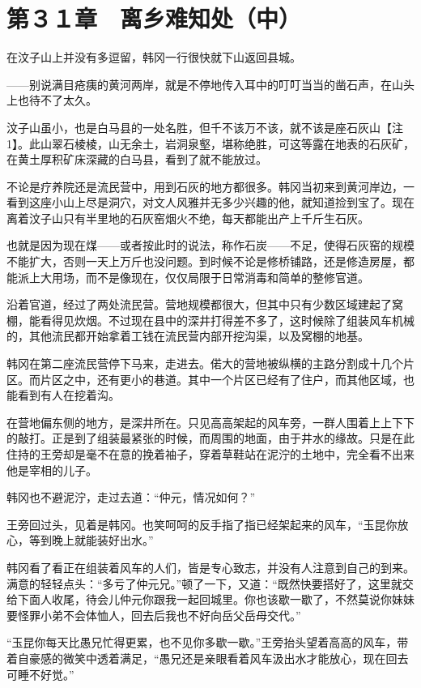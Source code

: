 \section{第３１章　离乡难知处（中）}

在汶子山上并没有多逗留，韩冈一行很快就下山返回县城。

——别说满目疮痍的黄河两岸，就是不停地传入耳中的叮叮当当的凿石声，在山头上也待不了太久。

汶子山虽小，也是白马县的一处名胜，但千不该万不该，就不该是座石灰山【注1】。此山翠石棱棱，山无余土，岩洞泉壑，堪称绝胜，可这等露在地表的石灰矿，在黄土厚积矿床深藏的白马县，看到了就不能放过。

不论是疗养院还是流民营中，用到石灰的地方都很多。韩冈当初来到黄河岸边，一看到这座小山上尽是洞穴，对文人风雅并无多少兴趣的他，就知道捡到宝了。现在离着汶子山只有半里地的石灰窑烟火不绝，每天都能出产上千斤生石灰。

也就是因为现在煤——或者按此时的说法，称作石炭——不足，使得石灰窑的规模不能扩大，否则一天上万斤也没问题。到时候不论是修桥铺路，还是修造房屋，都能派上大用场，而不是像现在，仅仅局限于日常消毒和简单的整修官道。

沿着官道，经过了两处流民营。营地规模都很大，但其中只有少数区域建起了窝棚，能看得见炊烟。不过现在县中的深井打得差不多了，这时候除了组装风车机械的，其他流民都开始拿着工钱在流民营内部开挖沟渠，以及窝棚的地基。

韩冈在第二座流民营停下马来，走进去。偌大的营地被纵横的主路分割成十几个片区。而片区之中，还有更小的巷道。其中一个片区已经有了住户，而其他区域，也能看到有人在挖着沟。

在营地偏东侧的地方，是深井所在。只见高高架起的风车旁，一群人围着上上下下的敲打。正是到了组装最紧张的时候，而周围的地面，由于井水的缘故。只是在此住持的王旁却是毫不在意的挽着袖子，穿着草鞋站在泥泞的土地中，完全看不出来他是宰相的儿子。

韩冈也不避泥泞，走过去道：“仲元，情况如何？”

王旁回过头，见着是韩冈。也笑呵呵的反手指了指已经架起来的风车，“玉昆你放心，等到晚上就能装好出水。”

韩冈看了看正在组装着风车的人们，皆是专心致志，并没有人注意到自己的到来。满意的轻轻点头：“多亏了仲元兄。”顿了一下，又道：“既然快要搭好了，这里就交给下面人收尾，待会儿仲元你跟我一起回城里。你也该歇一歇了，不然莫说你妹妹要怪罪小弟不会体恤人，回去后我也不好向岳父岳母交代。”

“玉昆你每天比愚兄忙得更累，也不见你多歇一歇。”王旁抬头望着高高的风车，带着自豪感的微笑中透着满足，“愚兄还是亲眼看着风车汲出水才能放心，现在回去可睡不好觉。”

